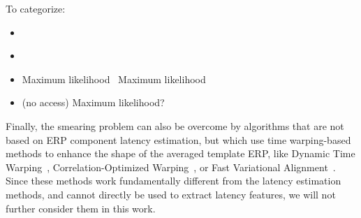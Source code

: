 To categorize:
\begin{itemize}
	\item \cite{Dimitriadis2018}
	\item \cite{Thornton2008}
	\item Maximum likelihood~\cite{tuan1987variable, Moecks1988,Puce1994} Maximum likelihood
	\item \cite{Gratton1989} (no access) Maximum likelihood?
\end{itemize}


Finally, the smearing problem can also be overcome by algorithms that are not
based on ERP component latency estimation, but which use time warping-based methods
to enhance the shape of the averaged template ERP, like Dynamic Time
Warping~\cite{486255, wang2001warp, Zoumpoulaki2015}, Correlation-Optimized
Warping~\cite{Skov2006}, or Fast Variational
Alignment~\cite{flotho2021fast}. Since these methods work
fundamentally different from the latency estimation methods, and cannot
directly be used to extract latency features, we will not further consider them
in this work.


